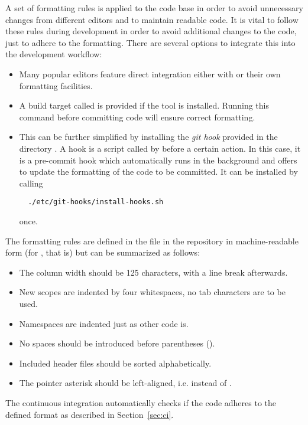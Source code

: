 A set of formatting rules is applied to the code base in order to avoid unnecessary changes from different editors and to maintain readable code.
It is vital to follow these rules during development in order to avoid additional changes to the code, just to adhere to the formatting.
There are several options to integrate this into the development workflow:

\begin{itemize}
  \item Many popular editors feature direct integration either with  or their own formatting facilities.
  \item A build target called  is provided if the  tool is installed. Running this command before committing code will ensure correct formatting.
  \item This can be further simplified by installing the \emph{git hook} provided in the directory . A hook is a script called by  before a certain action. In this case, it is a pre-commit hook which automatically runs  in the background and offers to update the formatting of the code to be committed. It can be installed by calling
  \begin{verbatim}
  ./etc/git-hooks/install-hooks.sh
  \end{verbatim}
  once.
\end{itemize}
The formatting rules are defined in the  file in the repository in machine-readable form (for , that is) but can be summarized as follows:

\begin{itemize}
  \item The column width should be 125 characters, with a line break afterwards.
  \item New scopes are indented by four whitespaces, no tab characters are to be used.
  \item Namespaces are indented just as other code is.
  \item No spaces should be introduced before parentheses ().
  \item Included header files should be sorted alphabetically.
  \item The pointer asterisk should be left-aligned, i.e.  instead of .
\end{itemize}
The continuous integration automatically checks if the code adheres to the defined format as described in Section~\ref{sec:ci}.

